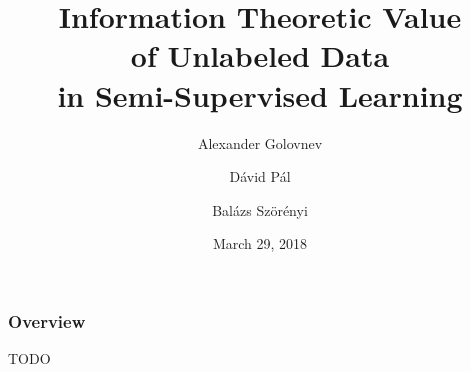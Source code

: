 \documentclass[usenames,dvipsnames]{beamer}
\title{Information Theoretic Value \\ of Unlabeled Data \\ in Semi-Supervised Learning}
\date{March 29, 2018}
\author{Alexander Golovnev \and D\'avid P\'al \and Bal\'azs Sz\"or\'enyi}
\begin{document}
\begin{frame}
\maketitle
\end{frame}

\begin{frame}
\frametitle{Overview}

TODO

\end{frame}
\end{document}
